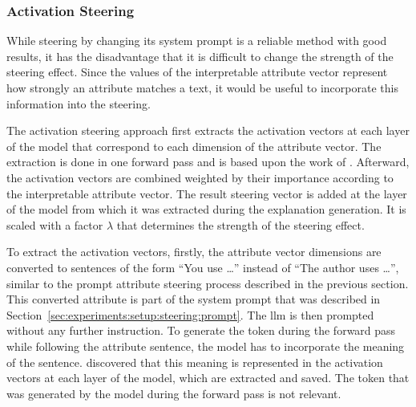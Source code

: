 
\subsubsection{Activation Steering}
\label{sec:experiments:setup:steering:activation}
While steering  by changing its system prompt is a reliable method with good results, it has the disadvantage that it is difficult to change the strength of the steering effect. Since the values of the interpretable attribute vector represent how strongly an attribute matches a text, it would be useful to incorporate this information into the steering.

The activation steering approach first extracts the activation vectors at each layer of the model that correspond to each dimension of the attribute vector. The extraction is done in one forward pass and is based upon the work of \citet{konenStyleVectorsSteering2024}. %
Afterward, the activation vectors are combined weighted by their importance according to the interpretable attribute vector. The result steering vector is added at the layer of the model from which it was extracted during the explanation generation. It is scaled with a factor \(\lambda\) that determines the strength of the steering effect.

To extract the activation vectors, firstly, the attribute vector dimensions are converted to sentences of the form \enquote{You use \ldots} instead of \enquote{The author uses \ldots}, similar to the prompt attribute steering process described in the previous section. This converted attribute is part of the system prompt that was described in Section~\ref{sec:experiments:setup:steering:prompt}. The \ac{llm} is then prompted without any further instruction. To generate the token during the forward pass while following the attribute sentence, the model has to incorporate the meaning of the sentence. \citet{konenStyleVectorsSteering2024} discovered that this meaning is represented in the activation vectors at each layer of the model, which are extracted and saved. The token that was generated by the model during the forward pass is not relevant.

